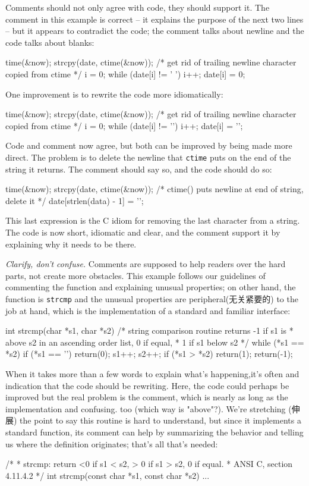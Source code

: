 Comments should not only agree with code, they should support it. The
comment in this example is correct -- it explains the purpose of the next
two lines -- but it appears to contradict the code; the comment talks about
newline and the code talks about blanks:
\begin{badcode}
    time(&now);
    strcpy(date, ctime(&now));
    /* get rid of trailing newline character copied from ctime */
    i = 0;
    while (date[i] != ' ') i++;
    date[i] = 0;
\end{badcode}
One improvement is to rewrite the code more idiomatically:
\begin{badcode}
    time(&now);
    strcpy(date, ctime(&now));
    /* get rid of trailing newline character copied from ctime */
    i = 0;
    while (date[i] != '\n') i++;
    date[i] = '\0';
\end{badcode}
Code and comment now agree, but both can be improved by being made more
direct. The problem is to delete the newline that \verb'ctime' puts on the
end of the string it returns. The comment should say so, and the code
should do so:
\begin{wellcode}
    time(&now);
    strcpy(date, ctime(&now));
    /* ctime() puts newline at end of string, delete it */
    date[strlen(data) - 1] = '\0';
\end{wellcode}
This last expression is the C idiom for removing the last character from a
string. The code is now short, idiomatic and clear, and the comment support
it by explaining why it needs to be there.

\emph{Clarify, don't confuse.} Comments are supposed to help readers over
the hard parts, not create more obstacles. This example follows our
guidelines of commenting the function and explaining unusual properties; on
other hand, the function is \verb'strcmp' and the unusual properties are
peripheral(无关紧要的) to the job at hand, which is the implementation of a
standard and familiar interface:
\begin{badcode}
    int strcmp(char *s1, char *s2)
    /* string comparison routine returns -1 if s1 is 
     * above s2 in an ascending order list, 0 if equal,
     * 1 if s1 below s2 
     */
    {
        while (*s1 == *s2) {
            if (*s1 == '\0') return(0);
            s1++;
            s2++;
        }
        if (*s1 > *s2) return(1);
        return(-1);
    }
\end{badcode}
When it takes more than a few words to explain what's happening,it's often
and indication that the code should be rewriting. Here, the code could
perhaps be improved but the real problem is the comment, which is nearly as
long as the implementation and confusing. too (which way is "above"?).
We're stretching (伸展) the point to say this routine is hard to
understand, but since it implements a standard function, its comment can
help by summarizing the behavior and telling us where the definition
originates; that's all that's needed:
\begin{wellcode}
    /*
     * strcmp: return <0 if s1 < s2, > 0 if s1 > s2, 0 if equal.
     * ANSI C, section 4.11.4.2
     */
    int strcmp(const char *s1, const char *s2)
    {
        ...
    }
\end{wellcode}

